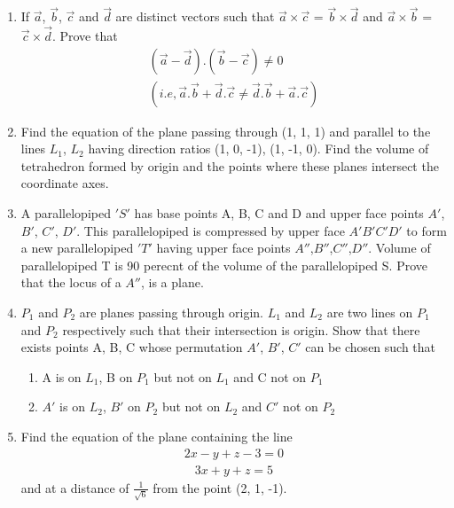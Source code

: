 \begin{enumerate}[label=\arabic*.,ref=\thesubsection.\theenumi]
\item If $\overrightarrow{a}$, $\overrightarrow{b}$, $\overrightarrow{c}$ and $\overrightarrow{d}$ are distinct vectors such that $\overrightarrow{a} \times \overrightarrow{c}$ = $\overrightarrow{b} \times 
\overrightarrow{d}$ and $\overrightarrow{a} \times \overrightarrow{b}$ = $\overrightarrow{c} \times 
\overrightarrow{d}$. Prove that
\begin{align*}
(\overrightarrow{a} - \overrightarrow{d}).(\overrightarrow{b} - \overrightarrow{c}) \neq 0 \\
(i.e, \overrightarrow{a}.\overrightarrow{b}+\overrightarrow{d}.\overrightarrow{c} \neq \overrightarrow{d}.\overrightarrow{b}+\overrightarrow{a}.\overrightarrow{c})
\end{align*}

\item Find the equation of the plane passing through (1, 1, 1) and parallel to the lines $L_1$, $L_2$ having direction ratios (1, 0, -1), (1, -1, 0). Find the volume of tetrahedron formed by origin and the points where these planes intersect the coordinate axes.

\item A parallelopiped $'S'$ has base points A, B, C and D and upper face points $A'$, $B'$, $C'$, $D'$. This parallelopiped is compressed by upper face $A'B'C'D'$ to form a new parallelopiped $'T'$ having upper face points $A''$,$B''$,$C''$,$D''$. Volume of parallelopiped T is 90 perecnt of the volume of the parallelopiped S. Prove that the locus of a $A''$, is a plane.

\item $P_1$ and $P_2$ are planes passing through origin. $L_1$ and $L_2$ are two lines on $P_1$ and $P_2$ respectively such that their intersection is origin. Show that there exists points A, B, C whose permutation $A'$, $B'$, $C'$ can be chosen such that
\begin{enumerate}
\item A is on $L_1$, B on $P_1$ but not on $L_1$ and C not on $P_1$
\item $A'$ is on $L_2$, $B'$ on $P_2$ but not on $L_2$ and $C'$ not on $P_2$
\end{enumerate} 

\item Find the equation of the plane containing the line
\begin{align*}
2x - y + z - 3 = 0
\end{align*}
\begin{align*}
3x + y + z = 5
\end{align*}
 and at a distance of $\frac{1}{\sqrt{6}}$ from the point (2, 1, -1).
 

\end{enumerate}
